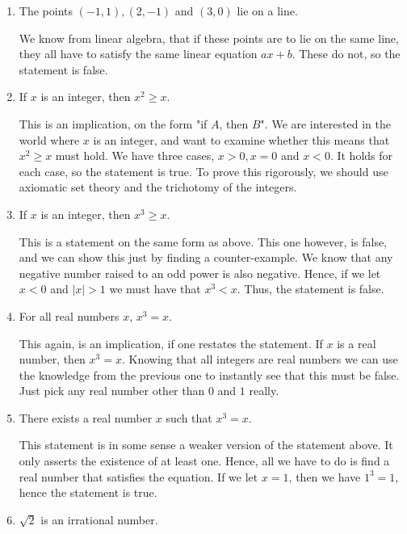 \documentclass[a4paper, 11pt]{report}
\theoremstyle{plain}
\theoremstyle{definition}
\begin{document}
\begin{enumerate}
  \item The points $(-1, 1), (2, -1)$ and $(3, 0)$ lie on a line.

    We know from linear algebra, that if these points are to lie on the
    same line, they all have to satisfy the same linear equation $ax + b$.
    These do not, so the statement is false.

  \item If $x$ is an integer, then $x^2 \geq x$.

    This is an implication, on the form "if $A$, then $B$". We are
    interested in the world where $x$ is an integer, and want to examine
    whether this means that $x^2 \geq x$ must hold. We have three cases, $x
    > 0, x = 0$ and $x < 0$.  It holds for each case, so the statement is
    true. To prove this rigorously, we should use axiomatic set theory and
    the trichotomy of the integers.

  \item If $x$ is an integer, then $x ^ 3 \geq x$.

    This is a statement on the same form as above. This one however, is
    false, and we can show this just by finding a counter-example. We know
    that any negative number raised to an odd power is also negative.
    Hence, if we let $x < 0$ and $|x| > 1$ we must have that $x ^ 3 < x$.
    Thus, the statement is false.  

  \item For all real numbers $x$, $x^3 = x$.

    This again, is an implication, if one restates the statement.  If $x$
    is a real number, then $x ^ 3 = x$. Knowing that all integers are real
    numbers we can use the knowledge from the previous one to instantly see
    that this must be false. Just pick any real number other than $0$ and
    $1$ really.

  \item There exists a real number $x$ such that $x ^ 3 = x$.

    This statement is in some sense a weaker version of the statement
    above. It only asserts the existence of at least one. Hence, all we
    have to do is find a real number that satisfies the equation. If we let
    $x = 1$, then we have $1 ^ 3 = 1$, hence the statement is true.

  \item $\sqrt{2}$ is an irrational number.


\end{enumerate}
\end{document}
